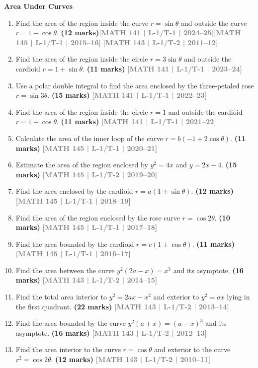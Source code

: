 \documentclass[12pt,a3paper]{article}
\newcommand{\yr}[1]{\hfill\textcolor{gray}{\small\textbf{[#1]}}}
\newcommand{\mk}[1]{\textcolor{orange!70!black}{\small\textbf{(#1 marks)}}}
\newcommand{\subtopic}[2]{%
  \vspace{10pt}
  \noindent\begin{tcolorbox}[colback=#1!8,colframe=#1,boxrule=0.6pt,arc=4pt,
    left=6pt,right=6pt,top=4pt,bottom=4pt]
    \small\bfseries\textcolor{#1}{#2}
  \end{tcolorbox}
  \vspace{2pt}
}
\begin{document}
\subtopic{cB}{Area Under Curves}
\label{sub:s2-area}

\begin{enumerate}

\item Find the area of the region inside the curve $r=\sin\theta$ and outside the curve $r=1-\cos\theta$. 
\mk{12}\yr{MATH 141 | L-1/T-1 | 2024--25}\yr{MATH 145 | L-1/T-1 | 2015--16} \yr{MATH 143 | L-1/T-2 | 2011--12}
  
\item Find the area of the region inside the circle $r=3\sin\theta$ and outside the cardioid $r=1+\sin\theta$.
\mk{11} \yr{MATH 141 | L-1/T-1 | 2023--24}

\item Use a polar double integral to find the area enclosed by the three-petaled rose $r=\sin 3\theta$.
\mk{15} \yr{MATH 141 | L-1/T-1 | 2022--23}

\item Find the area of the region inside the circle $r=1$ and outside the cardioid $r=1+\cos\theta$.
\mk{11} \yr{MATH 141 | L-1/T-1 | 2021--22}

\item Calculate the area of the inner loop of the curve $r=b(-1+2\cos\theta)$.
\mk{11} \yr{MATH 145 | L-1/T-1 | 2020--21}

\item Estimate the area of the region enclosed by $y^{2}=4x$ and $y=2x-4$.
\mk{15} \yr{MATH 145 | L-1/T-2 | 2019--20}

\item Find the area enclosed by the cardioid $r=a(1+\sin\theta)$.
\mk{12} \yr{MATH 145 | L-1/T-1 | 2018--19}

\item Find the area of the region enclosed by the rose curve $r=\cos 2\theta$.
\mk{10} \yr{MATH 145 | L-1/T-1 | 2017--18}

\item Find the area bounded by the cardioid $r=c(1+\cos\theta)$.
\mk{11} \yr{MATH 145 | L-1/T-1 | 2016--17}

\item Find the area between the curve $y^{2}(2a-x)=x^{3}$ and its asymptote.
\mk{16\textonehalf} \yr{MATH 143 | L-1/T-2 | 2014--15}

\item Find the total area interior to $y^{2}=2ax-x^{2}$ and exterior to $y^{2}=ax$ lying in the first quadrant.
\mk{22} \yr{MATH 143 | L-1/T-2 | 2013--14}

\item Find the area bounded by the curve $y^{2}(a+x)=(a-x)^{3}$ and its asymptote.
\mk{16} \yr{MATH 143 | L-1/T-2 | 2012--13}

\item Find the area interior to the curve $r=\cos\theta$ and exterior to the curve $r^{2}=\cos 2\theta$.
\mk{12} \yr{MATH 143 | L-1/T-2 | 2010--11}

\end{enumerate}
\end{document}

